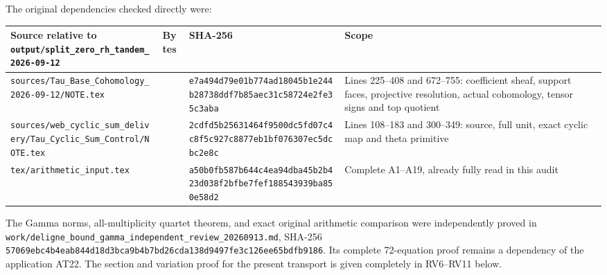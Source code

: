 The original dependencies checked directly were:

{\def\LTcaptype{none} %
\begin{longtable}[]{@{}
  >{\raggedright\arraybackslash}p{}
  >{\raggedleft\arraybackslash}p{}
  >{\raggedright\arraybackslash}p{}
  >{\raggedright\arraybackslash}p{}@{}}
\toprule\noalign{}
\begin{minipage}[b]{\linewidth}\raggedright
Source relative to \nolinkurl{output/split_zero_rh_tandem_2026-09-12}
\end{minipage} & \begin{minipage}[b]{\linewidth}\raggedleft
Bytes
\end{minipage} & \begin{minipage}[b]{\linewidth}\raggedright
SHA-256
\end{minipage} & \begin{minipage}[b]{\linewidth}\raggedright
Scope
\end{minipage} \\
\midrule\noalign{}
\endhead
\bottomrule\noalign{}
\endlastfoot
\nolinkurl{sources/Tau_Base_Cohomology_2026-09-12/NOTE.tex} & 28353 & \nolinkurl{e7a494d79e01b774ad18045b1e244b28738ddf7b85aec31c58724e2fe35c3aba} & Lines 225--408 and 672--755: coefficient sheaf, support faces, projective resolution, actual cohomology, tensor signs and top quotient \\
\nolinkurl{sources/web_cyclic_sum_delivery/Tau_Cyclic_Sum_Control/NOTE.tex} & 41804 & \nolinkurl{2cdfd5b25631464f9500dc5fd07c4c8f5c927c8877eb1bf076307ec5dcbc2e8c} & Lines 108--183 and 300--349: source, full unit, exact cyclic map and theta primitive \\
\nolinkurl{tex/arithmetic_input.tex} & 14644 & \nolinkurl{a50b0fb587b644c4ea94dba45b2b423d038f2bfbe7fef188543939ba850e58d2} & Complete A1--A19, already fully read in this audit \\
\end{longtable}
}

The Gamma norms, all-multiplicity quartet theorem, and exact original arithmetic comparison were independently proved in \nolinkurl{work/deligne_bound_gamma_independent_review_20260913.md}, SHA-256 \nolinkurl{57069ebc4b4eab844d18d3bca9b4b7bd26cda138d9497fe3c126ee65bdfb9186}. Its complete 72-equation proof remains a dependency of the application AT22. The section and variation proof for the present transport is given completely in RV6--RV11 below.

